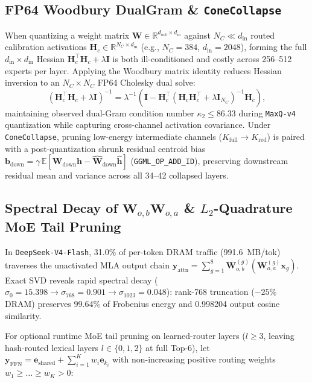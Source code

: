 \documentclass[10pt,twocolumn]{article}
\begin{document}
\subsection{FP64 Woodbury DualGram \& \texttt{ConeCollapse}}
When quantizing a weight matrix $\mathbf{W} \in \mathbb{R}^{d_{\text{out}} \times d_{\text{in}}}$ against $N_C \ll d_{\text{in}}$ routed calibration activations $\mathbf{H}_c \in \mathbb{R}^{N_C \times d_{\text{in}}}$ (e.g., $N_C = 384$, $d_{\text{in}} = 2048$), forming the full $d_{\text{in}}\times d_{\text{in}}$ Hessian $\mathbf{H}_c^\top \mathbf{H}_c + \lambda \mathbf{I}$ is both ill-conditioned and costly across 256--512 experts per layer. Applying the Woodbury matrix identity reduces Hessian inversion to an $N_C \times N_C$ FP64 Cholesky dual solve:
\begin{equation}
    (\mathbf{H}_c^\top \mathbf{H}_c + \lambda \mathbf{I})^{-1} = \lambda^{-1}\!\left(\mathbf{I} - \mathbf{H}_c^\top (\mathbf{H}_c \mathbf{H}_c^\top + \lambda \mathbf{I}_{N_C})^{-1} \mathbf{H}_c\right),
\end{equation}
maintaining observed dual-Gram condition number $\kappa_2 \le 86.33$ during \texttt{MaxQ-v4} quantization while capturing cross-channel activation covariance. Under \texttt{ConeCollapse}, pruning low-energy intermediate channels ($K_{\text{full}} \to K_{\text{red}}$) is paired with a post-quantization shrunk residual centroid bias $\mathbf{b}_{\text{down}} = \gamma\,\mathbb{E}[\mathbf{W}_{\text{down}}\mathbf{h} - \widehat{\mathbf{W}}_{\text{down}}\hat{\mathbf{h}}]$ (\texttt{GGML\_OP\_ADD\_ID}), preserving downstream residual mean and variance across all 34--42 collapsed layers.

\subsection{Spectral Decay of \texorpdfstring{$\mathbf{W}_{o,b}\mathbf{W}_{o,a}$}{Wob Woa} \& \texorpdfstring{$L_2$}{L2}-Quadrature MoE Tail Pruning}
In \texttt{DeepSeek-V4-Flash}, 31.0\% of per-token DRAM traffic (991.6~MB/tok) traverses the unactivated MLA output chain $\mathbf{y}_{\text{attn}} = \sum_{g=1}^{8} \mathbf{W}_{o,b}^{(g)}(\mathbf{W}_{o,a}^{(g)} \mathbf{x}_g)$. Exact SVD reveals rapid spectral decay ($\sigma_0 = 15.398 \to \sigma_{768} = 0.901 \to \sigma_{1023} = 0.048$): rank-768 truncation ($-25\%$ DRAM) preserves 99.64\% of Frobenius energy and 0.998204 output cosine similarity.

For optional runtime MoE tail pruning on learned-router layers ($l \ge 3$, leaving hash-routed lexical layers $l \in \{0,1,2\}$ at full Top-6), let $\mathbf{y}_{\text{FFN}} = \mathbf{e}_{\text{shared}} + \sum_{i=1}^{K} w_i \mathbf{e}_{k_i}$ with non-increasing positive routing weights $w_1 \ge \dots \ge w_K > 0$:
\end{document}
